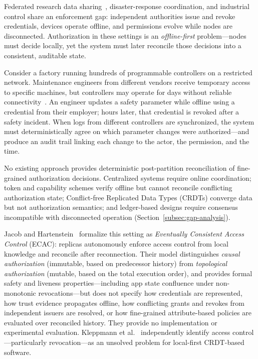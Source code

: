 \documentclass[10pt,journal,compsoc]{IEEEtran}
\begin{document}
  Federated research data sharing~\cite{HASSELGREN2020104040,10.1145/3511899},
  disaster-response coordination, and industrial control share an
  enforcement gap: independent authorities issue and revoke credentials,
  devices operate offline, and permissions evolve while nodes are
  disconnected.  Authorization in these settings is an
  \emph{offline-first} problem---nodes must decide locally, yet the
  system must later reconcile those decisions into a consistent,
  auditable state.

  Consider a factory running hundreds of programmable controllers on a
  restricted network.  Maintenance engineers from different vendors
  receive temporary access to specific machines, but controllers may
  operate for days without reliable
  connectivity~\cite{9551736,s23208535}.  An engineer updates a safety
  parameter while offline using a credential from their employer; hours
  later, that credential is revoked after a safety incident.  When logs
  from different controllers are synchronized, the system must
  deterministically agree on which parameter changes were
  authorized---and produce an audit trail linking each change to the
  actor, the permission, and the time.

  No existing approach provides deterministic post-partition
  reconciliation of fine-grained authorization decisions.
  Centralized systems require online coordination; token and
  capability schemes verify offline but cannot reconcile
  conflicting authorization state; Conflict-free Replicated Data Types (CRDTs) converge data but
  not authorization semantics; and ledger-based designs
  require consensus incompatible with disconnected operation
  (Section~\ref{subsec:gap-analysis}).

  Jacob and Hartenstein~\cite{jacob2024eventuallyac} formalize
  this setting as \emph{Eventually Consistent Access Control}
  (ECAC): replicas autonomously enforce access control from local
  knowledge and reconcile after reconnection. Their model distinguishes
  \emph{causal authorization} (immutable, based on predecessor history) from
  \emph{topological authorization} (mutable, based on the total execution order),
  and provides formal safety and liveness properties---including app state
  confluence under non-monotonic revocations---but does not specify
  how credentials are represented, how trust evidence propagates
  offline, how conflicting grants and revokes from independent
  issuers are resolved, or how fine-grained attribute-based
  policies are evaluated over reconciled history. They provide no
  implementation or experimental evaluation.
  Kleppmann et al.~\cite{kleppmann2019localfirst} independently
  identify access control---particularly revocation---as an
  unsolved problem for local-first CRDT-based software.
\end{document}
